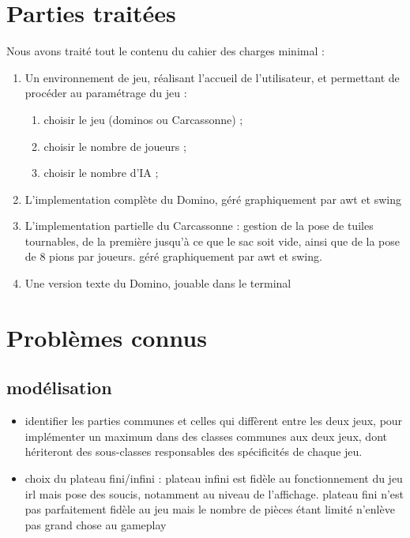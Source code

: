 \documentclass{article}
\begin{document}
\section{Parties traitées}
Nous avons traité tout le contenu du cahier des charges minimal :
\begin{enumerate}
    \item Un environnement de jeu, réalisant l’accueil de l’utilisateur, et permettant de procéder au paramétrage du jeu :
    \begin{enumerate}
        \item choisir le jeu (dominos ou Carcassonne) ;
        \item choisir le nombre de joueurs ;
        \item choisir le nombre d'IA ;
    \end{enumerate}
    \item L'implementation complète du Domino, géré graphiquement par awt et swing
    \item L'implementation partielle du Carcassonne : gestion de la pose de tuiles tournables, de la première jusqu'à ce que le sac soit vide, ainsi que de la pose de 8 pions par joueurs. géré graphiquement par awt et swing.
    \item Une version texte du Domino, jouable dans le terminal
\end{enumerate}

\section{Problèmes connus}

\subsection{modélisation} 

\begin{itemize}
  \item  identifier les parties communes et celles qui diffèrent entre les deux jeux, pour implémenter un maximum dans des classes communes aux deux jeux, dont hériteront des sous-classes responsables des spécificités de chaque jeu.
  \item choix du plateau fini/infini : plateau infini est fidèle au fonctionnement du jeu irl mais pose des soucis, notamment au niveau de l'affichage. plateau fini n'est pas parfaitement fidèle au jeu mais le nombre de pièces étant limité n'enlève pas grand chose au gameplay
\end{itemize}
\end{document}
